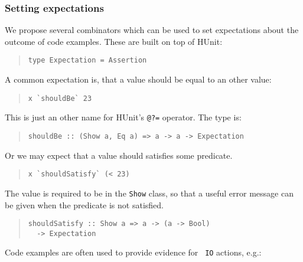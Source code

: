 \documentclass[preprint]{sigplanconf}
\begin{document}
\subsubsection{Setting expectations}

We propose several combinators which can be used to set expectations
about the outcome of code examples.  These are built on top of HUnit:

\begin{quote}\small\begin{verbatim}
type Expectation = Assertion
\end{verbatim}\end{quote}

\noindent A common expectation is, that a value should be equal to an other
value:

\begin{quote}\small\begin{verbatim}
x `shouldBe` 23
\end{verbatim}\end{quote}

\noindent This is just an other name for HUnit's \texttt{@?=}
operator.  The type is:

\begin{quote}\small\begin{verbatim}
shouldBe :: (Show a, Eq a) => a -> a -> Expectation
\end{verbatim}\end{quote}

\noindent Or we may expect that a value should satisfies some
predicate.

\begin{quote}\small\begin{verbatim}
x `shouldSatisfy` (< 23)
\end{verbatim}\end{quote}

\noindent The value is required to be in the \texttt{Show} class, so that a
useful error message can be given when the predicate is not satisfied.

\begin{quote}\small\begin{verbatim}
shouldSatisfy :: Show a => a -> (a -> Bool)
  -> Expectation
\end{verbatim}\end{quote}

\noindent Code examples are often used to provide evidence for {\tt
IO} actions, e.g.:
\end{document}
